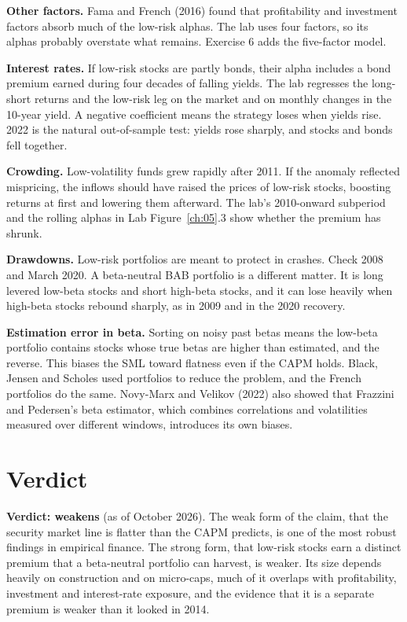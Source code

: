 \textbf{Other factors.} Fama and French (2016) found that profitability and investment factors absorb much of the low-risk alphas. The lab uses four factors, so its alphas probably overstate what remains. Exercise 6 adds the five-factor model.

\textbf{Interest rates.} If low-risk stocks are partly bonds, their alpha includes a bond premium earned during four decades of falling yields. The lab regresses the long-short returns and the low-risk leg on the market and on monthly changes in the 10-year yield. A negative coefficient means the strategy loses when yields rise. 2022 is the natural out-of-sample test: yields rose sharply, and stocks and bonds fell together.

\textbf{Crowding.} Low-volatility funds grew rapidly after 2011. If the anomaly reflected mispricing, the inflows should have raised the prices of low-risk stocks, boosting returns at first and lowering them afterward. The lab's 2010-onward subperiod and the rolling alphas in Lab Figure~\ref{ch:05}.3 show whether the premium has shrunk.

\textbf{Drawdowns.} Low-risk portfolios are meant to protect in crashes. Check 2008 and March 2020. A beta-neutral BAB portfolio is a different matter. It is long levered low-beta stocks and short high-beta stocks, and it can lose heavily when high-beta stocks rebound sharply, as in 2009 and in the 2020 recovery.

\textbf{Estimation error in beta.} Sorting on noisy past betas means the low-beta portfolio contains stocks whose true betas are higher than estimated, and the reverse. This biases the SML toward flatness even if the CAPM holds. Black, Jensen and Scholes used portfolios to reduce the problem, and the French portfolios do the same. Novy-Marx and Velikov (2022) also showed that Frazzini and Pedersen's beta estimator, which combines correlations and volatilities measured over different windows, introduces its own biases.

\section{Verdict}
\label{sec:05-verdict}

\begin{callout}
\textbf{Verdict: weakens} (as of October 2026). The weak form of the claim, that the security market line is flatter than the CAPM predicts, is one of the most robust findings in empirical finance. The strong form, that low-risk stocks earn a distinct premium that a beta-neutral portfolio can harvest, is weaker. Its size depends heavily on construction and on micro-caps, much of it overlaps with profitability, investment and interest-rate exposure, and the evidence that it is a separate premium is weaker than it looked in 2014.
\end{callout}

